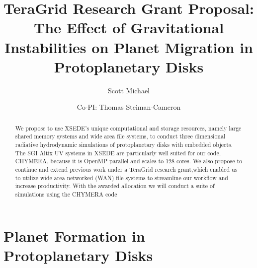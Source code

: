 \documentclass[12pt,preprint2]{aastex}
\begin{document}
\renewcommand{\baselinestretch}{1.00}

\title{\large TeraGrid Research Grant Proposal: The Effect of Gravitational Instabilities on Planet Migration in Protoplanetary Disks}

\author{Scott Michael
\and
Co-PI: Thomas Steiman-Cameron}


\begin{abstract}

  We propose to use XSEDE's unique computational and storage resources, namely large shared memory systems and wide area
  file systems, to conduct three dimensional radiative hydrodynamic simulations of protoplanetary disks with embedded
  objects. The SGI Altix UV systems in XSEDE are particularly well suited for our code, CHYMERA, because it is OpenMP
  parallel and scales to 128 cores. We also propose to continue and extend previous work under a TeraGrid research
  grant,which enabled us to utilize wide area networked (WAN) file systems to streamline our workflow and increase
  productivity. With the awarded allocation we will conduct a suite of simulations using the CHYMERA code 
  \\

\end{abstract}

\section{Planet Formation in Protoplanetary Disks}
\label{sec:intro}
\end{document}
